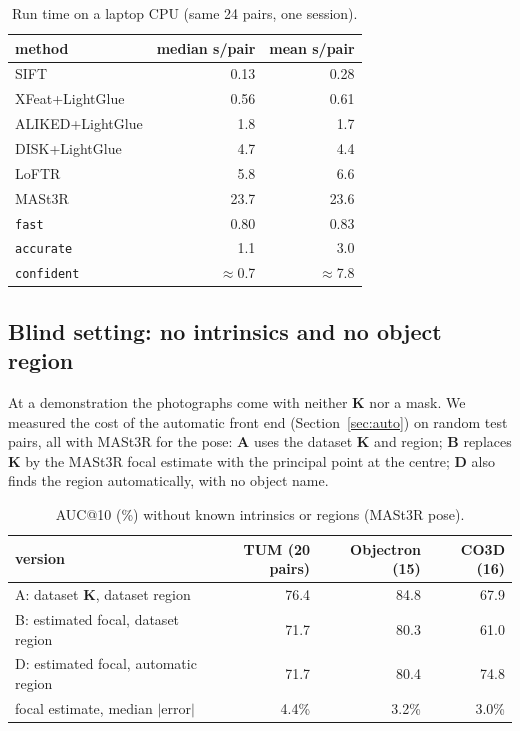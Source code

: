 \documentclass[11pt,a4paper]{article}
\newcommand{\K}{\mathbf{K}}
\begin{document}
\begin{table}[H]
\centering
\small
\begin{tabular}{l rr}
\toprule
method & median s/pair & mean s/pair \\
\midrule
SIFT & 0.13 & 0.28 \\
XFeat+LightGlue & 0.56 & 0.61 \\
ALIKED+LightGlue & 1.8 & 1.7 \\
DISK+LightGlue & 4.7 & 4.4 \\
LoFTR & 5.8 & 6.6 \\
MASt3R & 23.7 & 23.6 \\
\texttt{fast} & 0.80 & 0.83 \\
\texttt{accurate} & 1.1 & 3.0 \\
\texttt{confident} & $\approx$0.7 & $\approx$7.8 \\
\bottomrule
\end{tabular}
\caption{Run time on a laptop CPU (same 24 pairs, one session).}
\end{table}

\subsection{Blind setting: no intrinsics and no object region}

At a demonstration the photographs come with neither $\K$ nor a mask. We measured the cost of the
automatic front end (Section~\ref{sec:auto}) on random test pairs, all with MASt3R for the pose:
\textbf{A} uses the dataset $\K$ and region; \textbf{B} replaces $\K$ by the MASt3R focal estimate
with the principal point at the centre; \textbf{D} also finds the region automatically, with no
object name.

\begin{table}[H]
\centering
\small
\begin{tabular}{l rrr}
\toprule
version & TUM (20 pairs) & Objectron (15) & CO3D (16) \\
\midrule
A: dataset $\K$, dataset region & 76.4 & 84.8 & 67.9 \\
B: estimated focal, dataset region & 71.7 & 80.3 & 61.0 \\
D: estimated focal, automatic region & 71.7 & 80.4 & 74.8 \\
\midrule
focal estimate, median $|$error$|$ & 4.4\% & 3.2\% & 3.0\% \\
\bottomrule
\end{tabular}
\caption{AUC@10 (\%) without known intrinsics or regions (MASt3R pose).}
\label{tab:blind}
\end{table}
\end{document}
